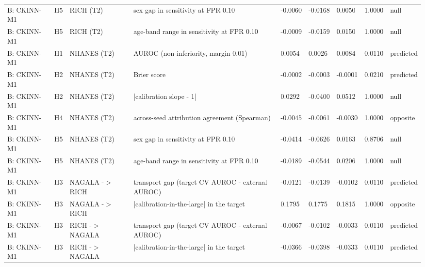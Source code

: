 \begin{table}[ht]
\begin{tabular}{lllllllll}
B: CKINN-M1 & H5 & RICH (T2) & sex gap in sensitivity at FPR 0.10 & -0.0060 & -0.0168 & 0.0050 & 1.0000 & null \\
B: CKINN-M1 & H5 & RICH (T2) & age-band range in sensitivity at FPR 0.10 & -0.0009 & -0.0159 & 0.0150 & 1.0000 & null \\
B: CKINN-M1 & H1 & NHANES (T2) & AUROC (non-inferiority, margin 0.01) & 0.0054 & 0.0026 & 0.0084 & 0.0110 & predicted \\
B: CKINN-M1 & H2 & NHANES (T2) & Brier score & -0.0002 & -0.0003 & -0.0001 & 0.0210 & predicted \\
B: CKINN-M1 & H2 & NHANES (T2) & |calibration slope - 1| & 0.0292 & -0.0400 & 0.0512 & 1.0000 & null \\
B: CKINN-M1 & H4 & NHANES (T2) & across-seed attribution agreement (Spearman) & -0.0045 & -0.0061 & -0.0030 & 1.0000 & opposite \\
B: CKINN-M1 & H5 & NHANES (T2) & sex gap in sensitivity at FPR 0.10 & -0.0414 & -0.0626 & 0.0163 & 0.8706 & null \\
B: CKINN-M1 & H5 & NHANES (T2) & age-band range in sensitivity at FPR 0.10 & -0.0189 & -0.0544 & 0.0206 & 1.0000 & null \\
B: CKINN-M1 & H3 & NAGALA -$>$ RICH & transport gap (target CV AUROC - external AUROC) & -0.0121 & -0.0139 & -0.0102 & 0.0110 & predicted \\
B: CKINN-M1 & H3 & NAGALA -$>$ RICH & |calibration-in-the-large| in the target & 0.1795 & 0.1775 & 0.1815 & 1.0000 & opposite \\
B: CKINN-M1 & H3 & RICH -$>$ NAGALA & transport gap (target CV AUROC - external AUROC) & -0.0067 & -0.0102 & -0.0033 & 0.0110 & predicted \\
B: CKINN-M1 & H3 & RICH -$>$ NAGALA & |calibration-in-the-large| in the target & -0.0366 & -0.0398 & -0.0333 & 0.0110 & predicted \\
\bottomrule
\end{tabular}
\end{table}

